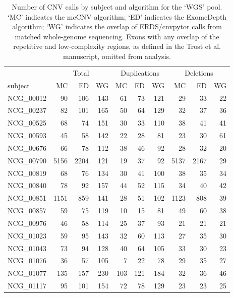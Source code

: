 \begin{table}[]
\centering
\begin{tabular}{lrrrrrrrrr}
  \toprule   & \multicolumn{3}{c}{Total} & \multicolumn{3}{c}{Duplications} & \multicolumn{3}{c}{Deletions} \\ \cmidrule(lr){2-4}\cmidrule(lr){5-7}\cmidrule(lr){8-10}subject & MC & ED & WG & MC & ED & WG & MC & ED & WG \\ 
  \midrule
NCG\_00012 & 90 & 106 & 143 & 61 & 73 & 121 & 29 & 33 & 22 \\ 
  NCG\_00237 & 82 & 101 & 165 & 50 & 64 & 129 & 32 & 37 & 36 \\ 
  NCG\_00525 & 68 & 74 & 151 & 30 & 33 & 110 & 38 & 41 & 41 \\ 
  NCG\_00593 & 45 & 58 & 142 & 22 & 28 & 81 & 23 & 30 & 61 \\ 
  NCG\_00676 & 66 & 78 & 112 & 38 & 46 & 92 & 28 & 32 & 20 \\ 
  NCG\_00790 & 5156 & 2204 & 121 & 19 & 37 & 92 & 5137 & 2167 & 29 \\ 
  NCG\_00819 & 68 & 76 & 134 & 30 & 41 & 100 & 38 & 35 & 34 \\ 
  NCG\_00840 & 78 & 92 & 157 & 44 & 52 & 115 & 34 & 40 & 42 \\ 
  NCG\_00851 & 1151 & 859 & 141 & 28 & 51 & 102 & 1123 & 808 & 39 \\ 
  NCG\_00857 & 59 & 75 & 119 & 10 & 15 & 81 & 49 & 60 & 38 \\ 
  NCG\_00976 & 46 & 58 & 114 & 25 & 37 & 93 & 21 & 21 & 21 \\ 
  NCG\_01023 & 59 & 95 & 143 & 32 & 60 & 113 & 27 & 35 & 30 \\ 
  NCG\_01043 & 73 & 94 & 128 & 40 & 64 & 105 & 33 & 30 & 23 \\ 
  NCG\_01076 & 36 & 57 & 105 & 7 & 22 & 78 & 29 & 35 & 27 \\ 
  NCG\_01077 & 135 & 157 & 230 & 103 & 121 & 184 & 32 & 36 & 46 \\ 
  NCG\_01117 & 95 & 101 & 154 & 72 & 78 & 129 & 23 & 23 & 25 \\ 
   \bottomrule
\end{tabular}
\caption{Number of CNV calls by subject and algorithm for the `WGS' pool. `MC' indicates the mcCNV algorithm; `ED' indicates the ExomeDepth algorithm; `WG' indicates the overlap of ERDS/cnvpytor calls from matched whole-genome sequencing. Exons with any overlap of the repetitive and low-complexity regions, as defined in the Trost et al. manuscript, omitted from analysis.} 
\label{tab:wgsCallBySbj}
\end{table}
